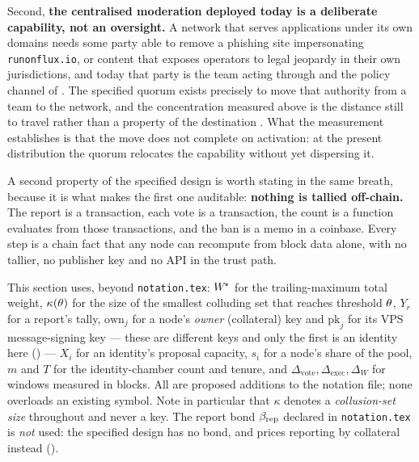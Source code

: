 Second, \textbf{the centralised moderation deployed today is a deliberate capability, not an
oversight.} A network that serves applications under its own domains needs some party able to remove
a phishing site impersonating \texttt{runonflux.io}, or content that exposes operators to legal
jeopardy in their own jurisdictions, and today that party is the team acting through \FDM{} and the
policy channel of . The specified quorum exists precisely to move that authority
from a team to the network, and the concentration measured above is the distance still to travel
rather than a property of the destination . What the measurement establishes
is that the move does not complete on activation: at the present distribution the quorum relocates
the capability without yet dispersing it.

A second property of the specified design is worth stating in the same breath, because it is what
makes the first one auditable: \textbf{nothing is tallied off-chain.} The report is a transaction,
each vote is a transaction, the count is a function \fluxd{} evaluates from those transactions, and
the ban is a memo in a coinbase. Every step is a chain fact that any node can recompute from block
data alone, with no tallier, no publisher key and no API in the trust path.

\begin{remark}
This section uses, beyond \texttt{notation.tex}: $W^{\!\star}$ for the trailing-maximum total
weight, $\kappa(\theta)$ for the size of the smallest colluding set that reaches threshold
$\theta$, $Y_r$ for a report's tally, $\mathrm{own}_j$ for a node's \emph{owner} (collateral) key
and $\mathrm{pk}_j$ for its VPS message-signing key --- these are different keys and only the first
is an identity here () --- $X_i$ for an identity's proposal capacity, $s_i$
for a node's share of the \PNR pool, $m$ and $T$ for the identity-chamber count and tenure, and
$\Delta_{\mathrm{vote}}, \Delta_{\mathrm{exec}}, \Delta_{W}$ for windows measured in blocks. All are
proposed additions to the notation file; none overloads an existing symbol. Note in particular that
$\kappa$ denotes a \emph{collusion-set size} throughout and never a key. The report bond $\beta_{\mathrm{rep}}$
declared in \texttt{notation.tex} is \emph{not} used: the specified design has no bond, and prices
reporting by collateral instead ().
\end{remark}

